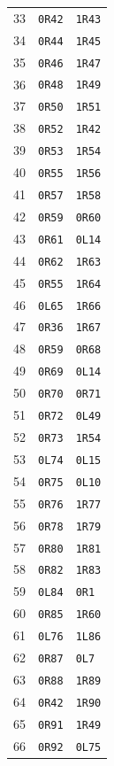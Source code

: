 \begin{longtable}{rll}
33 & \texttt{0R42} & \texttt{1R43}\\
34 & \texttt{0R44} & \texttt{1R45}\\
35 & \texttt{0R46} & \texttt{1R47}\\
36 & \texttt{0R48} & \texttt{1R49}\\
37 & \texttt{0R50} & \texttt{1R51}\\
38 & \texttt{0R52} & \texttt{1R42}\\
39 & \texttt{0R53} & \texttt{1R54}\\
40 & \texttt{0R55} & \texttt{1R56}\\
41 & \texttt{0R57} & \texttt{1R58}\\
42 & \texttt{0R59} & \texttt{0R60}\\
43 & \texttt{0R61} & \texttt{0L14}\\
44 & \texttt{0R62} & \texttt{1R63}\\
45 & \texttt{0R55} & \texttt{1R64}\\
46 & \texttt{0L65} & \texttt{1R66}\\
47 & \texttt{0R36} & \texttt{1R67}\\
48 & \texttt{0R59} & \texttt{0R68}\\
49 & \texttt{0R69} & \texttt{0L14}\\
50 & \texttt{0R70} & \texttt{0R71}\\
51 & \texttt{0R72} & \texttt{0L49}\\
52 & \texttt{0R73} & \texttt{1R54}\\
53 & \texttt{0L74} & \texttt{0L15}\\
54 & \texttt{0R75} & \texttt{0L10}\\
55 & \texttt{0R76} & \texttt{1R77}\\
56 & \texttt{0R78} & \texttt{1R79}\\
57 & \texttt{0R80} & \texttt{1R81}\\
58 & \texttt{0R82} & \texttt{1R83}\\
59 & \texttt{0L84} & \texttt{0R1}\\
60 & \texttt{0R85} & \texttt{1R60}\\
61 & \texttt{0L76} & \texttt{1L86}\\
62 & \texttt{0R87} & \texttt{0L7}\\
63 & \texttt{0R88} & \texttt{1R89}\\
64 & \texttt{0R42} & \texttt{1R90}\\
65 & \texttt{0R91} & \texttt{1R49}\\
66 & \texttt{0R92} & \texttt{0L75}\\

\end{longtable}
